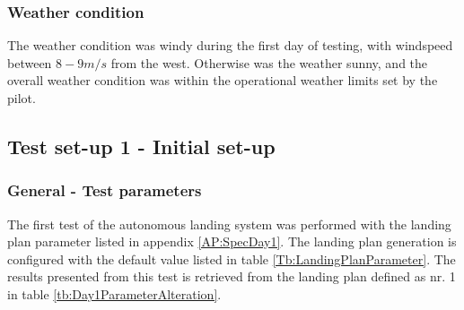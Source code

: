 \subsubsection{Weather condition}
The weather condition was windy during the first day of testing, with windspeed between $8-9 m/s$ from the west. Otherwise was the weather sunny, and the overall weather condition was within the operational weather limits set by the pilot.
\subsection{Test set-up 1 - Initial set-up}
\subsubsection{General - Test parameters}\label{ss:TestParaInitiDay1}
The first test of the autonomous landing system was performed with the landing plan parameter listed in appendix \ref{AP:SpecDay1}. The landing plan generation is configured with the default value listed in table \ref{Tb:LandingPlanParameter}. The results presented from this test is retrieved from the landing plan defined as nr. 1 in table \ref{tb:Day1ParameterAlteration}.
